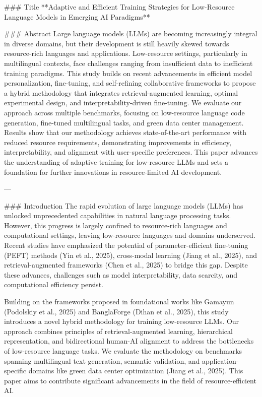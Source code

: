 ### Title
**Adaptive and Efficient Training Strategies for Low-Resource Language Models in Emerging AI Paradigms**

### Abstract
Large language models (LLMs) are becoming increasingly integral in diverse domains, but their development is still heavily skewed towards resource-rich languages and applications. Low-resource settings, particularly in multilingual contexts, face challenges ranging from insufficient data to inefficient training paradigms. This study builds on recent advancements in efficient model personalization, fine-tuning, and self-refining collaborative frameworks to propose a hybrid methodology that integrates retrieval-augmented learning, optimal experimental design, and interpretability-driven fine-tuning. We evaluate our approach across multiple benchmarks, focusing on low-resource language code generation, fine-tuned multilingual tasks, and green data center management. Results show that our methodology achieves state-of-the-art performance with reduced resource requirements, demonstrating improvements in efficiency, interpretability, and alignment with user-specific preferences. This paper advances the understanding of adaptive training for low-resource LLMs and sets a foundation for further innovations in resource-limited AI development.

---

### Introduction
The rapid evolution of large language models (LLMs) has unlocked unprecedented capabilities in natural language processing tasks. However, this progress is largely confined to resource-rich languages and computational settings, leaving low-resource languages and domains underserved. Recent studies have emphasized the potential of parameter-efficient fine-tuning (PEFT) methods (Yin et al., 2025), cross-modal learning (Jiang et al., 2025), and retrieval-augmented frameworks (Chen et al., 2025) to bridge this gap. Despite these advances, challenges such as model interpretability, data scarcity, and computational efficiency persist. 

Building on the frameworks proposed in foundational works like Gamayun (Podolskiy et al., 2025) and BanglaForge (Dihan et al., 2025), this study introduces a novel hybrid methodology for training low-resource LLMs. Our approach combines principles of retrieval-augmented learning, hierarchical representation, and bidirectional human-AI alignment to address the bottlenecks of low-resource language tasks. We evaluate the methodology on benchmarks spanning multilingual text generation, semantic validation, and application-specific domains like green data center optimization (Jiang et al., 2025). This paper aims to contribute significant advancements in the field of resource-efficient AI.


